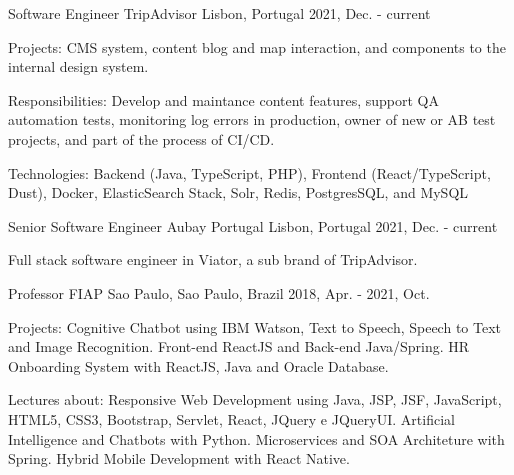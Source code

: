 

\begin{cventries}

  \cventry
    {Software Engineer} %
    {TripAdvisor} %
    {Lisbon, Portugal} %
    {2021, Dec. - current} %
    {
      \begin{cvitems} %
        \item {Projects: CMS system, content blog and map interaction, and components to the internal design system.}
        \item {Responsibilities: Develop and maintance content features, support QA automation tests, monitoring log errors in production, owner of new or AB test projects, and part of the process of CI/CD.}
        \item {Technologies: Backend (Java, TypeScript, PHP), Frontend (React/TypeScript, Dust), Docker, ElasticSearch Stack, Solr, Redis, PostgresSQL, and MySQL}
      \end{cvitems}
    }

  \cventry
    {Senior Software Engineer} %
    {Aubay Portugal} %
    {Lisbon, Portugal} %
    {2021, Dec. - current} %
    {
      \begin{cvitems} %
        \item {Full stack software engineer in Viator, a sub brand of TripAdvisor.}
      \end{cvitems}
    }

  \cventry
    {Professor} %
    {FIAP} %
    {Sao Paulo, Sao Paulo, Brazil} %
    {2018, Apr. - 2021, Oct.} %
    {
      \begin{cvitems} %
        \item {Projects: Cognitive Chatbot using IBM Watson, Text to Speech, Speech to Text and Image Recognition. Front-end ReactJS and Back-end Java/Spring. HR Onboarding System with ReactJS, Java and Oracle Database.}
        \item {Lectures about: Responsive Web Development using Java, JSP, JSF, JavaScript, HTML5, CSS3, Bootstrap, Servlet, React, JQuery e JQueryUI. Artificial Intelligence and Chatbots with Python. Microservices and SOA Architeture with Spring. Hybrid Mobile Development with React Native.}
      \end{cvitems}
    }


\end{cventries}
